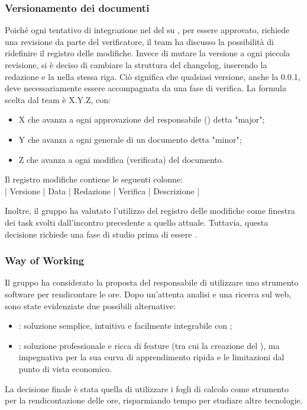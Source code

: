 \subsubsection{Versionamento dei documenti} \label{sec:versionamento}
\par Poiché ogni tentativo di integrazione nel  del  su , per essere approvato, richiede una revisione da parte del verificatore, il team ha discusso la possibilità di ridefinire il registro delle modifiche. Invece di mutare la versione a ogni piccola revisione, si è deciso di cambiare la struttura del changelog, inserendo la redazione e la  nella stessa riga. Ciò significa che qualsiasi versione, anche la 0.0.1, deve necessariamente essere accompagnata da una fase di verifica. La formula scelta dal team è X.Y.Z, con:
\begin{itemize}
	\item X che avanza a ogni approvazione del responsabile () detta "major";
	\item Y che avanza a ogni  generale di un documento detta "minor";
	\item Z che avanza a ogni modifica (verificata) del documento.
\end{itemize}

\vspace{0.5\baselineskip}
\par Il registro modifiche contiene le seguenti colonne: \\
\vspace{\baselineskip}
\hspace{1cm} | Versione | Data | Redazione | Verifica | Descrizione |
\par Inoltre, il gruppo ha valutato l'utilizzo del registro delle modifiche come finestra dei task svolti dall'incontro precedente a quello attuale. Tuttavia, questa decisione richiede una fase di studio prima di essere .

\subsubsection{Way of Working}
\par Il gruppo ha considerato la proposta del responsabile di utilizzare uno strumento software per rendicontare le ore. Dopo un'attenta analisi e una ricerca sul web, sono state evidenziate due possibili alternative:
\begin{itemize}
	\item {}: soluzione semplice, intuitiva e facilmente integrabile con ;
	\item {}: soluzione professionale e ricca di feature (tra cui la creazione del ), ma impegnativa per la sua curva di apprendimento ripida e le limitazioni dal punto di vista economico.
\end{itemize}
\par La decisione finale è stata quella di utilizzare i fogli di calcolo come strumento per la rendicontazione delle ore, risparmiando tempo per studiare altre tecnologie. 

